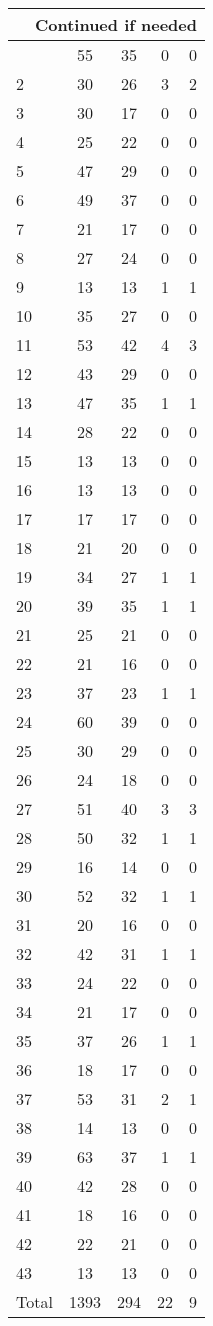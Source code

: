 \begin{center}
\begin{longtable}{l|c|c|c|c}
\hline \multicolumn{5}{|r|}{{Continued if needed}} \\ \hline
\endfoot 
1 & 55 & 35 & 0 & 0\\ \hline
2 & 30 & 26 & 3 & 2\\ \hline
3 & 30 & 17 & 0 & 0\\ \hline
4 & 25 & 22 & 0 & 0\\ \hline
5 & 47 & 29 & 0 & 0\\ \hline
6 & 49 & 37 & 0 & 0\\ \hline
7 & 21 & 17 & 0 & 0\\ \hline
8 & 27 & 24 & 0 & 0\\ \hline
9 & 13 & 13 & 1 & 1\\ \hline
10 & 35 & 27 & 0 & 0\\ \hline
11 & 53 & 42 & 4 & 3\\ \hline
12 & 43 & 29 & 0 & 0\\ \hline
13 & 47 & 35 & 1 & 1\\ \hline
14 & 28 & 22 & 0 & 0\\ \hline
15 & 13 & 13 & 0 & 0\\ \hline
16 & 13 & 13 & 0 & 0\\ \hline
17 & 17 & 17 & 0 & 0\\ \hline
18 & 21 & 20 & 0 & 0\\ \hline
19 & 34 & 27 & 1 & 1\\ \hline
20 & 39 & 35 & 1 & 1\\ \hline
21 & 25 & 21 & 0 & 0\\ \hline
22 & 21 & 16 & 0 & 0\\ \hline
23 & 37 & 23 & 1 & 1\\ \hline
24 & 60 & 39 & 0 & 0\\ \hline
25 & 30 & 29 & 0 & 0\\ \hline
26 & 24 & 18 & 0 & 0\\ \hline
27 & 51 & 40 & 3 & 3\\ \hline
28 & 50 & 32 & 1 & 1\\ \hline
29 & 16 & 14 & 0 & 0\\ \hline
30 & 52 & 32 & 1 & 1\\ \hline
31 & 20 & 16 & 0 & 0\\ \hline
32 & 42 & 31 & 1 & 1\\ \hline
33 & 24 & 22 & 0 & 0\\ \hline
34 & 21 & 17 & 0 & 0\\ \hline
35 & 37 & 26 & 1 & 1\\ \hline
36 & 18 & 17 & 0 & 0\\ \hline
37 & 53 & 31 & 2 & 1\\ \hline
38 & 14 & 13 & 0 & 0\\ \hline
39 & 63 & 37 & 1 & 1\\ \hline
40 & 42 & 28 & 0 & 0\\ \hline
41 & 18 & 16 & 0 & 0\\ \hline
42 & 22 & 21 & 0 & 0\\ \hline
43 & 13 & 13 & 0 & 0\\ \hline
\hline \hline
Total & 1393 & 294 & 22 & 9




\end{longtable}
\end{center}
